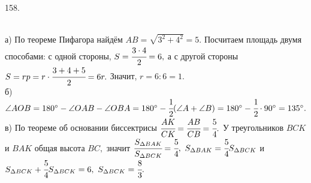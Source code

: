158. \begin{figure}[ht!]
\end{figure}\\
а) По теореме Пифагора найдём $AB=\sqrt{3^2+4^2}=5.$ Посчитаем площадь двумя способами: с одной стороны, $S=\cfrac{3\cdot4}{2}=6,$ а с другой стороны $S=rp=r\cdot\cfrac{3+4+5}{2}=6r.$ Значит, $r=6:6=1.$\\
б) $\angle AOB=180^\circ-\angle OAB-\angle OBA=180^\circ-\cfrac{1}{2}(\angle A+\angle B)=180^\circ-\cfrac{1}{2}\cdot90^\circ=135^\circ.$\\
в) По теореме об основании биссектрисы $\cfrac{AK}{CK}=\cfrac{AB}{CB}=\cfrac{5}{4}.$ У треугольников $BCK$ и $BAK$ общая высота $BC,$ значит $\cfrac{S_{\Delta BAK}}{S_{\Delta BCK}}=\cfrac{5}{4},\ S_{\Delta BAK}=\cfrac{5}{4}S_{\Delta BCK}$ и $S_{\Delta BCK}+\cfrac{5}{4}S_{\Delta BCK}=6,\ S_{\Delta BCK}=\cfrac{8}{3}.$\newpage\noindent
